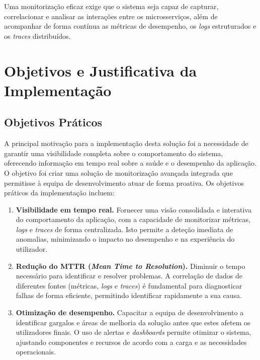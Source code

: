 Uma monitorização eficaz exige que o sistema seja capaz de capturar, correlacionar e analisar as interações entre os microsserviços, além de acompanhar de forma contínua as métricas de desempenho, os \textit{logs} estruturados e os \textit{traces} distribuídos.


\section{Objetivos e Justificativa da Implementação}

\subsection{Objetivos Práticos}

A principal motivação para a implementação desta solução foi a necessidade de garantir uma visibilidade completa sobre o comportamento do sistema, oferecendo informação em tempo real sobre a saúde e o desempenho da aplicação. O objetivo foi criar uma solução de monitorização avançada integrada que permitisse à equipa de desenvolvimento atuar de forma proativa. Os objetivos práticos da implementação incluem:

\begin{enumerate}
    \item \textbf{Visibilidade em tempo real.} Fornecer uma visão consolidada e interativa do comportamento da aplicação, com a capacidade de monitorizar métricas, \textit{logs} e \textit{traces} de forma centralizada. Isto permite a deteção imediata de anomalias, minimizando o impacto no desempenho e na experiência do utilizador.

    \item \textbf{Redução do MTTR (\textit{Mean Time to Resolution}).} Diminuir o tempo necessário para identificar e resolver problemas. A correlação de dados de diferentes fontes (métricas, \textit{logs} e \textit{traces}) é fundamental para diagnosticar falhas de forma eficiente, permitindo identificar rapidamente a sua causa.

    \item \textbf{Otimização de desempenho.} Capacitar a equipa de desenvolvimento a identificar gargalos e áreas de melhoria da solução antes que estes afetem os utilizadores finais. O uso de alertas e \textit{dashboards} permite otimizar o sistema, ajustando componentes e recursos de acordo com a carga e as necessidades operacionais.
\end{enumerate}

